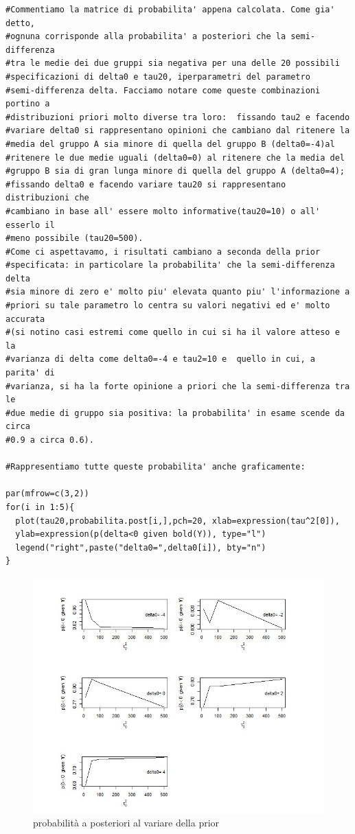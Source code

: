 \begin{itemize}
\begin{lstlisting}[style=R]
#Commentiamo la matrice di probabilita' appena calcolata. Come gia' detto,
#ognuna corrisponde alla probabilita' a posteriori che la semi-differenza
#tra le medie dei due gruppi sia negativa per una delle 20 possibili
#specificazioni di delta0 e tau20, iperparametri del parametro
#semi-differenza delta. Facciamo notare come queste combinazioni portino a
#distribuzioni priori molto diverse tra loro:  fissando tau2 e facendo
#variare delta0 si rappresentano opinioni che cambiano dal ritenere la
#media del gruppo A sia minore di quella del gruppo B (delta0=-4)al
#ritenere le due medie uguali (delta0=0) al ritenere che la media del
#gruppo B sia di gran lunga minore di quella del gruppo A (delta0=4);
#fissando delta0 e facendo variare tau20 si rappresentano distribuzioni che
#cambiano in base all' essere molto informative(tau20=10) o all' esserlo il
#meno possibile (tau20=500).
#Come ci aspettavamo, i risultati cambiano a seconda della prior
#specificata: in particolare la probabilita' che la semi-differenza delta
#sia minore di zero e' molto piu' elevata quanto piu' l'informazione a
#priori su tale parametro lo centra su valori negativi ed e' molto accurata
#(si notino casi estremi come quello in cui si ha il valore atteso e la
#varianza di delta come delta0=-4 e tau2=10 e  quello in cui, a parita' di
#varianza, si ha la forte opinione a priori che la semi-differenza tra le
#due medie di gruppo sia positiva: la probabilita' in esame scende da circa
#0.9 a circa 0.6).

#Rappresentiamo tutte queste probabilita' anche graficamente:

par(mfrow=c(3,2))
for(i in 1:5){
  plot(tau20,probabilita.post[i,],pch=20, xlab=expression(tau^2[0]),
  ylab=expression(p(delta<0 given bold(Y)), type="l")
  legend("right",paste("delta0=",delta0[i]), bty="n")
}

\end{lstlisting}

\begin{figure}[!ht]
 \centering
 \includegraphics[scale = 0.7]{img/figura12}
 \caption{probabilità a posteriori al variare della prior}
 \label{figure:figura12}
\end{figure}


\end{itemize}

